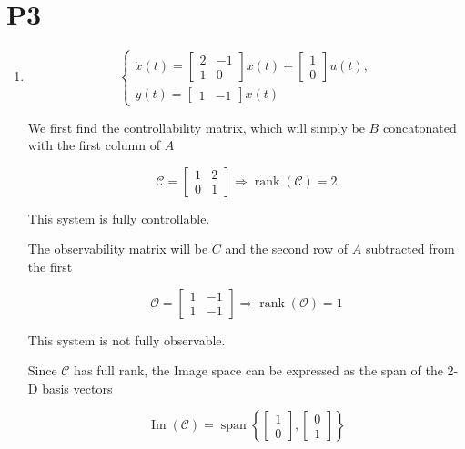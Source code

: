 \documentclass{article}
\begin{document}
\section*{P3}

\begin{enumerate}[label=\alph*)]
    \item 

\[
\left\{
    \begin{array}{l}
        \dot x(t) = 
        \begin{bmatrix}
            2 & -1 \\
            1 & 0 
        \end{bmatrix}
        x(t) + 
        \begin{bmatrix}
            1 \\
            0
        \end{bmatrix}
        u(t), \\
        y(t) = 
        \begin{bmatrix}
            1 & -1
        \end{bmatrix}
        x(t)
    \end{array}
\right.
\]

We first find the controllability matrix, which will simply be $B$ concatonated with the first column of $A$

\[
    \mathcal{C} =
    \begin{bmatrix}
        1 & 2 \\
        0 & 1
    \end{bmatrix}
    \Rightarrow \operatorname{rank}(\mathcal{C}) = 2
\]

This system is fully controllable.

The observability matrix will be $C$ and the second row of $A$ subtracted from the first

\[
    \mathcal{O} = 
    \begin{bmatrix}
        1 & -1 \\
        1 & -1    
    \end{bmatrix}
    \Rightarrow \operatorname{rank}(\mathcal{O}) = 1
\]

This system is not fully observable.

Since $\mathcal{C}$ has full rank, the Image space can be expressed as the span of the 2-D basis vectors

\[
\operatorname{Im}(\mathcal{C}) = \operatorname{span}
    \left\{
    \begin{bmatrix}
        1 \\
        0
    \end{bmatrix},
    \begin{bmatrix}
        0 \\
        1
    \end{bmatrix}
    \right\}
\]


\end{enumerate}
\end{document}
